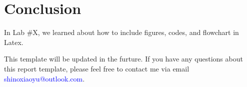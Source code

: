 \section{Conclusion}

In Lab \#X, we learned about how to include figures, codes, and flowchart in Latex.

This template will be updated in the furture. If you have any questions about this report template, please feel free to contact me via email {\textcolor{blue}{shinoxiaoyu@outlook.com}}.